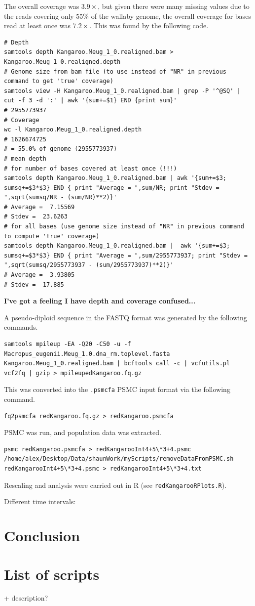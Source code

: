 \documentclass[11pt,a4paper]{article}
\begin{document}
The overall coverage was $3.9\times$, but given there were many missing values due to the reads covering only 55\% of the wallaby genome, the overall coverage for bases read at least once was $7.2\times$. This was found by the following code.
\begin{lstlisting}
# Depth
samtools depth Kangaroo.Meug_1_0.realigned.bam > Kangaroo.Meug_1_0.realigned.depth
# Genome size from bam file (to use instead of "NR" in previous command to get 'true' coverage)
samtools view -H Kangaroo.Meug_1_0.realigned.bam | grep -P '^@SQ' | cut -f 3 -d ':' | awk '{sum+=$1} END {print sum}'
# 2955773937
# Coverage
wc -l Kangaroo.Meug_1_0.realigned.depth
# 1626674725
# = 55.0% of genome (2955773937)
# mean depth
# for number of bases covered at least once (!!!)
samtools depth Kangaroo.Meug_1_0.realigned.bam | awk '{sum+=$3; sumsq+=$3*$3} END { print "Average = ",sum/NR; print "Stdev = ",sqrt(sumsq/NR - (sum/NR)**2)}'
# Average =  7.15569
# Stdev =  23.6263
# for all bases (use genome size instead of "NR" in previous command to compute 'true' coverage)
samtools depth Kangaroo.Meug_1_0.realigned.bam |  awk '{sum+=$3; sumsq+=$3*$3} END { print "Average = ",sum/2955773937; print "Stdev = ",sqrt(sumsq/2955773937 - (sum/2955773937)**2)}'
# Average =  3.93805
# Stdev =  17.885
\end{lstlisting}
\textbf{I've got a feeling I have depth and coverage confused...}


A pseudo-diploid sequence in the FASTQ format was generated by the following commands.
\begin{lstlisting}
samtools mpileup -EA -Q20 -C50 -u -f Macropus_eugenii.Meug_1.0.dna_rm.toplevel.fasta Kangaroo.Meug_1_0.realigned.bam | bcftools call -c | vcfutils.pl vcf2fq | gzip > mpileupedKangaroo.fq.gz
\end{lstlisting}

This was converted into the \verb|.psmcfa| PSMC input format via the following command.
\begin{lstlisting}
fq2psmcfa redKangaroo.fq.gz > redKangaroo.psmcfa
\end{lstlisting}
PSMC was run, and population data was extracted.
\begin{lstlisting}
psmc redKangaroo.psmcfa > redKangarooInt4+5\*3+4.psmc
/home/alex/Desktop/Data/shaunWork/myScripts/removeDataFromPSMC.sh redKangarooInt4+5\*3+4.psmc > redKangarooInt4+5\*3+4.txt
\end{lstlisting}
Rescaling and analysis were carried out in R (see \verb|redKangarooRPlots.R|).

Different time intervals:


\section{Conclusion}


{}
\newpage

\appendix
\section{List of scripts}
+ description?
\end{document}
